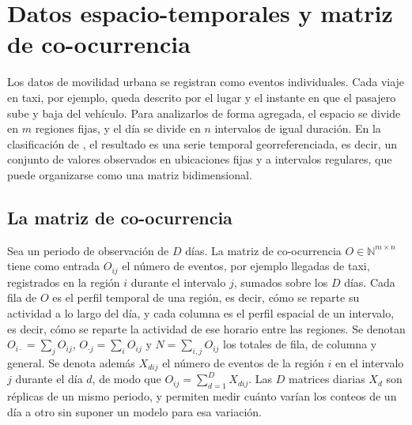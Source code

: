 \section{Datos espacio-temporales y matriz de co-ocurrencia}\label{sec:matriz}

Los datos de movilidad urbana se registran como eventos individuales. Cada viaje
en taxi, por ejemplo, queda descrito por el lugar y el instante en que el pasajero
sube y baja del vehículo. Para analizarlos de forma agregada, el espacio se divide
en $m$ regiones fijas, y el día se divide en $n$ intervalos de igual duración. En la
clasificación de \citet{Wu2020}, el resultado es una serie temporal
georreferenciada, es decir, un conjunto de valores observados en ubicaciones fijas y a
intervalos regulares, que puede organizarse como una matriz bidimensional.

\subsection{La matriz de co-ocurrencia}

Sea un periodo de observación de $D$ días. La matriz de co-ocurrencia
$O \in \mathbb{N}^{m \times n}$ tiene como entrada $O_{ij}$ el número de eventos,
por ejemplo llegadas de taxi, registrados en la región $i$ durante el intervalo
$j$, sumados sobre los $D$ días. Cada fila de $O$ es el perfil temporal de
una región, es decir, cómo se reparte su actividad a lo largo del día, y cada
columna es el perfil espacial de un intervalo, es decir, cómo se reparte la
actividad de ese horario entre las regiones. Se denotan
$O_{i\cdot} = \sum_j O_{ij}$, $O_{\cdot j} = \sum_i O_{ij}$ y $N = \sum_{i,j} O_{ij}$
los totales de fila, de columna y general. Se denota además $X_{dij}$ el número
de eventos de la región $i$ en el intervalo $j$ durante el día $d$, de modo que
$O_{ij} = \sum_{d=1}^{D} X_{dij}$. Las $D$ matrices diarias $X_d$ son réplicas
de un mismo periodo, y permiten medir cuánto varían los conteos de un día a
otro sin suponer un modelo para esa variación.

